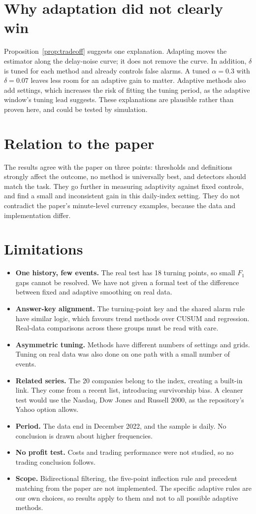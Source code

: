 \documentclass[12pt,a4paper]{report}
\theoremstyle{definition}\newtheorem{definition}{Definition}[chapter]
\begin{document}
\section{Why adaptation did not clearly win}
Proposition~\ref{prop:tradeoff} suggests one explanation. Adapting moves the estimator along the delay-noise curve; it does not remove the curve. In addition, $\delta$ is tuned for each method and already controls false alarms. A tuned $\alpha=0.3$ with $\delta=0.07$ leaves less room for an adaptive gain to matter. Adaptive methods also add settings, which increases the risk of fitting the tuning period, as the adaptive window's tuning lead suggests. These explanations are plausible rather than proven here, and could be tested by simulation.
\section{Relation to the paper}
The results agree with the paper on three points: thresholds and definitions strongly affect the outcome, no method is universally best, and detectors should match the task. They go further in measuring adaptivity against fixed controls, and find a small and inconsistent gain in this daily-index setting. They do not contradict the paper's minute-level currency examples, because the data and implementation differ.
\section{Limitations}
\begin{itemize}
\item \textbf{One history, few events.} The real test has 18 turning points, so small $F_1$ gaps cannot be resolved. We have not given a formal test of the difference between fixed and adaptive smoothing on real data.
\item \textbf{Answer-key alignment.} The turning-point key and the shared alarm rule have similar logic, which favours trend methods over CUSUM and regression. Real-data comparisons across these groups must be read with care.
\item \textbf{Asymmetric tuning.} Methods have different numbers of settings and grids. Tuning on real data was also done on one path with a small number of events.
\item \textbf{Related series.} The 20 companies belong to the index, creating a built-in link. They come from a recent list, introducing survivorship bias. A cleaner test would use the Nasdaq, Dow Jones and Russell 2000, as the repository's Yahoo option allows.
\item \textbf{Period.} The data end in December 2022, and the sample is daily. No conclusion is drawn about higher frequencies.
\item \textbf{No profit test.} Costs and trading performance were not studied, so no trading conclusion follows.
\item \textbf{Scope.} Bidirectional filtering, the five-point inflection rule and precedent matching from the paper are not implemented. The specific adaptive rules are our own choices, so results apply to them and not to all possible adaptive methods.
\end{itemize}
\end{document}
